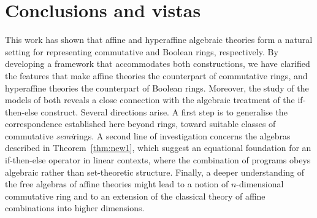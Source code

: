 \documentclass{amsart}
\numberwithin{equation}{section}
\theoremstyle{plain}
\theoremstyle{definition}
\begin{document}
\section{Conclusions and vistas}
\label{sec:conclusions}
This work has shown that affine and hyperaffine algebraic theories form a natural setting for representing commutative and Boolean rings, respectively.  
By developing a framework that accommodates both constructions, we have clarified the features that make affine theories the counterpart of commutative rings, and hyperaffine theories the counterpart of Boolean rings. 
Moreover, the study of the models of both reveals a close connection with the algebraic treatment of the if-then-else construct.
Several directions arise.
A first step is to generalise the correspondence established here beyond rings, toward suitable classes of commutative \emph{semi}rings.
A second line of investigation concerns the algebras described in Theorem~\ref{thm:new1}, which suggest an equational foundation for an if-then-else operator in linear contexts, where the combination of programs obeys algebraic rather than set-theoretic structure.
Finally, a deeper understanding of the free algebras of affine theories
might lead %
to a notion of $n$-dimensional commutative ring and 
to an extension of the classical theory of affine combinations into higher dimensions.
%
%
%


\end{document}
